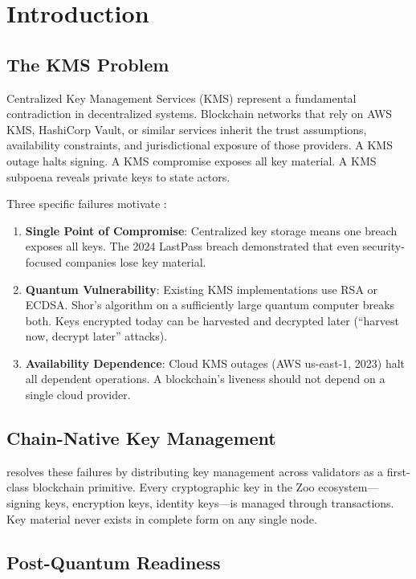 \section{Introduction}


\subsection{The KMS Problem}

Centralized Key Management Services (KMS) represent a fundamental contradiction in decentralized systems. Blockchain networks that rely on AWS KMS, HashiCorp Vault, or similar services inherit the trust assumptions, availability constraints, and jurisdictional exposure of those providers. A KMS outage halts signing. A KMS compromise exposes all key material. A KMS subpoena reveals private keys to state actors.

Three specific failures motivate \KChain{}:

\begin{enumerate}
\item \textbf{Single Point of Compromise}: Centralized key storage means one breach exposes all keys. The 2024 LastPass breach demonstrated that even security-focused companies lose key material.
\item \textbf{Quantum Vulnerability}: Existing KMS implementations use RSA or ECDSA. Shor's algorithm on a sufficiently large quantum computer breaks both. Keys encrypted today can be harvested and decrypted later (``harvest now, decrypt later'' attacks).
\item \textbf{Availability Dependence}: Cloud KMS outages (AWS us-east-1, 2023) halt all dependent operations. A blockchain's liveness should not depend on a single cloud provider.
\end{enumerate}

\subsection{Chain-Native Key Management}

\KChain{} resolves these failures by distributing key management across validators as a first-class blockchain primitive. Every cryptographic key in the Zoo ecosystem---signing keys, encryption keys, identity keys---is managed through \KeyVM{} transactions. Key material never exists in complete form on any single node.

\subsection{Post-Quantum Readiness}

